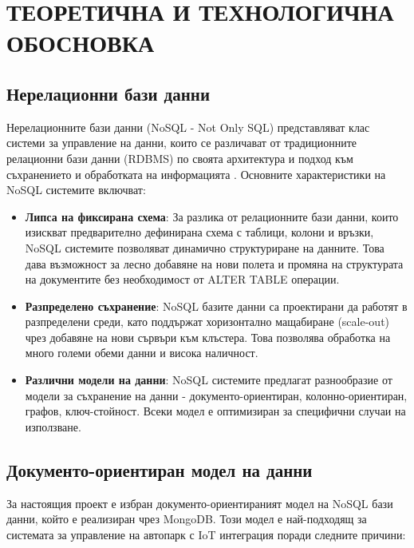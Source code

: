 
\section{ТЕОРЕТИЧНА И ТЕХНОЛОГИЧНА ОБОСНОВКА}

\subsection{Нерелационни бази данни}

Нерелационните бази данни (NoSQL - Not Only SQL) представляват клас системи за управление на данни, които се различават от традиционните релационни бази данни (RDBMS) по своята архитектура и подход към съхранението и обработката на информацията \cite{sadalage2012nosql}. Основните характеристики на NoSQL системите включват:

\begin{itemize}
    \item \textbf{Липса на фиксирана схема}: За разлика от релационните бази данни, които изискват предварително дефинирана схема с таблици, колони и връзки, NoSQL системите позволяват динамично структуриране на данните. Това дава възможност за лесно добавяне на нови полета и промяна на структурата на документите без необходимост от ALTER TABLE операции.

    \item \textbf{Разпределено съхранение}: NoSQL базите данни са проектирани да работят в разпределени среди, като поддържат хоризонтално мащабиране (scale-out) чрез добавяне на нови сървъри към клъстера. Това позволява обработка на много големи обеми данни и висока наличност.

    \item \textbf{Различни модели на данни}: NoSQL системите предлагат разнообразие от модели за съхранение на данни - документо-ориентиран, колонно-ориентиран, графов, ключ-стойност. Всеки модел е оптимизиран за специфични случаи на използване.
\end{itemize}

\subsection{Документо-ориентиран модел на данни}

За настоящия проект е избран документо-ориентираният модел на NoSQL бази данни, който е реализиран чрез MongoDB. Този модел е най-подходящ за системата за управление на автопарк с IoT интеграция поради следните причини:

